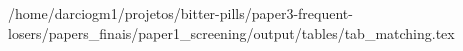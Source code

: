 /home/darciogm1/projetos/bitter-pills/paper3-frequent-losers/papers_finais/paper1_screening/output/tables/tab_matching.tex